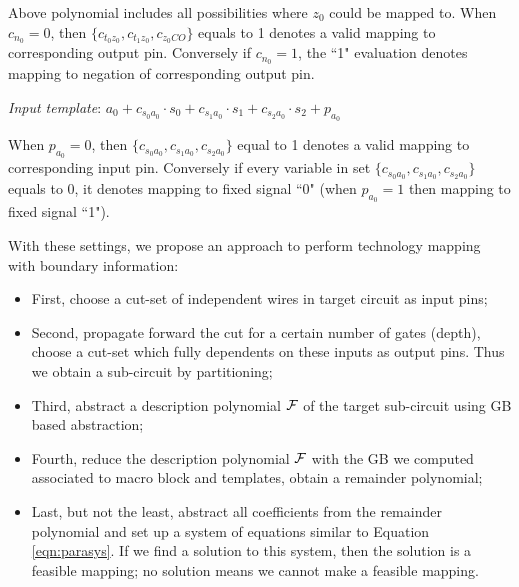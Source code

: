 Above polynomial includes all possibilities where $z_0$ could be mapped to.
When $c_{n_0} = 0$, then $\{c_{t_0z_0},c_{t_1z_0},c_{z_0CO}\}$ equals to 1 denotes a valid mapping to corresponding output pin. 
Conversely if $c_{n_0} = 1$, the ``1" evaluation denotes mapping to negation of corresponding output pin.

{\it Input template}: $a_0+c_{s_0a_0}\cdot s_0+c_{s_1a_0}\cdot s_1+c_{s_2a_0}\cdot s_2+p_{a_0}$

When $p_{a_0} = 0$, then $\{c_{s_0a_0},c_{s_1a_0},c_{s_2a_0}\}$ equal to 1 denotes a valid mapping to corresponding input
pin. Conversely if every variable in set $\{c_{s_0a_0},c_{s_1a_0},c_{s_2a_0}\}$ equals to 0, 
it denotes mapping to fixed signal ``0" (when $p_{a_0} = 1$ then
mapping to fixed signal ``1").

With these settings, we propose an approach to perform technology mapping with boundary information:
\begin{itemize}
\item First, choose a cut-set of independent wires in target circuit as input pins;

\item Second, propagate forward the cut for a certain number of gates (depth), choose a cut-set
which fully dependents on these inputs as output pins. Thus we obtain a sub-circuit by partitioning;

\item Third, abstract a description polynomial ${\mathcal{F}}$ of the target sub-circuit using GB based abstraction;

\item Fourth, reduce the description polynomial ${\mathcal{F}}$ with the GB we computed associated to macro block 
and templates, obtain a remainder polynomial;

\item Last, but not the least, abstract all coefficients from the remainder polynomial and set up 
a system of equations similar to Equation \ref{eqn:parasys}.
If we find a solution to this system, then the solution is a feasible mapping; no solution means we cannot make a
feasible mapping.
\end{itemize}
